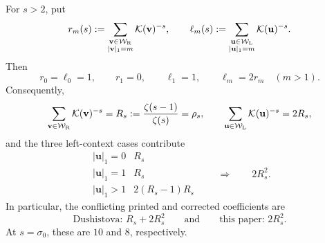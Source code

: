 \begin{lemma}
\label{lem:dushistova-endpoint-correction}
For \(s>2\), put
\[
 r_m(s):=\sum_{\substack{\mathbf v\in\mathcal W_{\rm R}\\
                          |\mathbf v|_1=m}}
          \mathcal K(\mathbf v)^{-s},
 \qquad
 \ell_m(s):=\sum_{\substack{\mathbf u\in\mathcal W_{\rm L}\\
                             |\mathbf u|_1=m}}
          \mathcal K(\mathbf u)^{-s}.
\]
Then
\[
 r_0=\ell_0=1,\qquad r_1=0,\qquad \ell_1=1,
 \qquad \ell_m=2r_m\quad(m>1).
\]
Consequently,
\begin{equation}
 \sum_{\mathbf v\in\mathcal W_{\rm R}}\mathcal K(\mathbf v)^{-s}
 =R_s:=\frac{\zeta(s-1)}{\zeta(s)}=\rho_s,
 \qquad
 \sum_{\mathbf u\in\mathcal W_{\rm L}}\mathcal K(\mathbf u)^{-s}
 =2R_s,
 \label{eq:brocot-context-masses}
\end{equation}
and the three left-context cases contribute
\begin{equation}
 \begin{array}{c|c}
  |\mathbf u|_1=0 & R_s\\
  |\mathbf u|_1=1 & R_s\\
  |\mathbf u|_1>1 & 2(R_s-1)R_s
 \end{array}
 \qquad\Longrightarrow\qquad 2R_s^2.
 \label{eq:left-context-endpoint-cases}
\end{equation}
In particular, the conflicting printed and corrected coefficients are
\begin{equation}
 \boxed{\text{Dushistova: }R_s+2R_s^2}
 \qquad\text{and}\qquad
 \boxed{\text{this paper: }2R_s^2}.
 \label{eq:dushistova-conflicting-constants}
\end{equation}
At \(s=\sigma_0\), these are \(10\) and \(8\), respectively.
\end{lemma}

